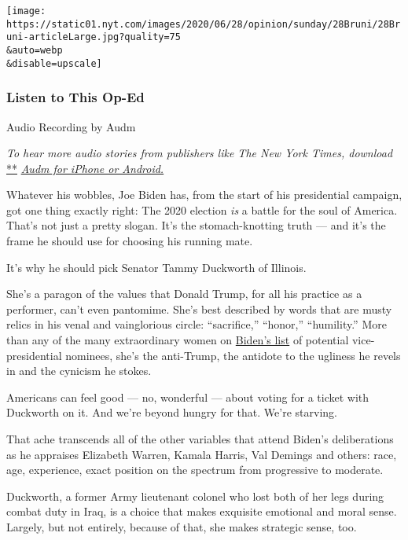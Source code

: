\texttt{[image: https://static01.nyt.com/images/2020/06/28/opinion/sunday/28Bruni/28Bruni-articleLarge.jpg?quality=75\\\&auto=webp\\\&disable=upscale]}

\hypertarget{listen-to-this-op-ed}{%
\subsubsection{Listen to This Op-Ed}\label{listen-to-this-op-ed}}

Audio Recording by Audm

\emph{To hear more audio stories from publishers like The New York
Times, download}
\href{https://www.audm.com/?utm_source=nytmag\&utm_medium=embed\&utm_campaign=left_behind_draper}{**}
\href{https://www.audm.com/?utm_source=nytopinion\&utm_medium=embed\&utm_campaign=biden_best_veep}{\emph{Audm
for iPhone or Android.}}

Whatever his wobbles, Joe Biden has, from the start of his presidential
campaign, got one thing exactly right: The 2020 election \emph{is} a
battle for the soul of America. That's not just a pretty slogan. It's
the stomach-knotting truth --- and it's the frame he should use for
choosing his running mate.

It's why he should pick Senator Tammy Duckworth of Illinois.

She's a paragon of the values that Donald Trump, for all his practice as
a performer, can't even pantomime. She's best described by words that
are musty relics in his venal and vainglorious circle: ``sacrifice,''
``honor,'' ``humility.'' More than any of the many extraordinary women
on
\href{https://www.nytimes.com/article/biden-vice-president-2020.html}{Biden's
list} of potential vice-presidential nominees, she's the anti-Trump, the
antidote to the ugliness he revels in and the cynicism he stokes.

Americans can feel good --- no, wonderful --- about voting for a ticket
with Duckworth on it. And we're beyond hungry for that. We're starving.

That ache transcends all of the other variables that attend Biden's
deliberations as he appraises Elizabeth Warren, Kamala Harris, Val
Demings and others: race, age, experience, exact position on the
spectrum from progressive to moderate.

Duckworth, a former Army lieutenant colonel who lost both of her legs
during combat duty in Iraq, is a choice that makes exquisite emotional
and moral sense. Largely, but not entirely, because of that, she makes
strategic sense, too.


